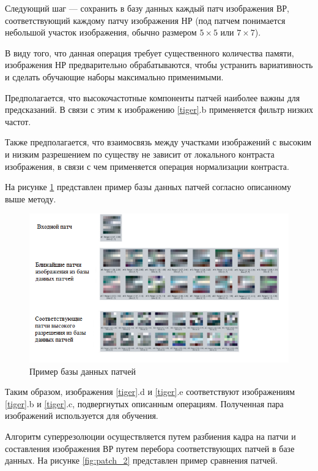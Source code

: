 Следующий шаг --- сохранить в базу данных каждый патч изображения ВР, соответствующий каждому патчу изображения НР (под патчем понимается небольшой участок изображения, обычно размером $5\times5$ или $7 \times 7$). 

В виду того, что данная операция требует существенного количества памяти, изображения НР предварительно обрабатываются, чтобы устранить вариативность и сделать обучающие наборы максимально применимыми.

Предполагается, что высокочастотные компоненты патчей наиболее важны для предсказаний. В связи с этим к изображению \ref{tiger}.b применяется фильтр низких частот. 

Также предполагается, что взаимосвязь между участками изображений с высоким и низким разрешением по существу не зависит от локального контраста изображения, в связи с чем применяется операция нормализации контраста.

На рисунке \ref{fig:patch_1} представлен пример базы данных патчей согласно описанному выше методу.

\begin{figure}[H]
	\centering
	\includegraphics[scale=1.05]{assets/patch_2.png}
	\caption{Пример базы данных патчей}
	\label{fig:patch_1}
\end{figure}

\clearpage

Таким образом, изображения \ref{tiger}.d и \ref{tiger}.e соответствуют изображениям \ref{tiger}.b  и \ref{tiger}.c, подвергнутых описанным операциям. Полученная пара изображений используется для обучения.

Алгоритм суперрезолюции осуществляется путем разбиения кадра на патчи и составления изображения ВР путем перебора соответствующих патчей в базе данных. На рисунке \ref{fig:patch_2} представлен пример сравнения патчей.


